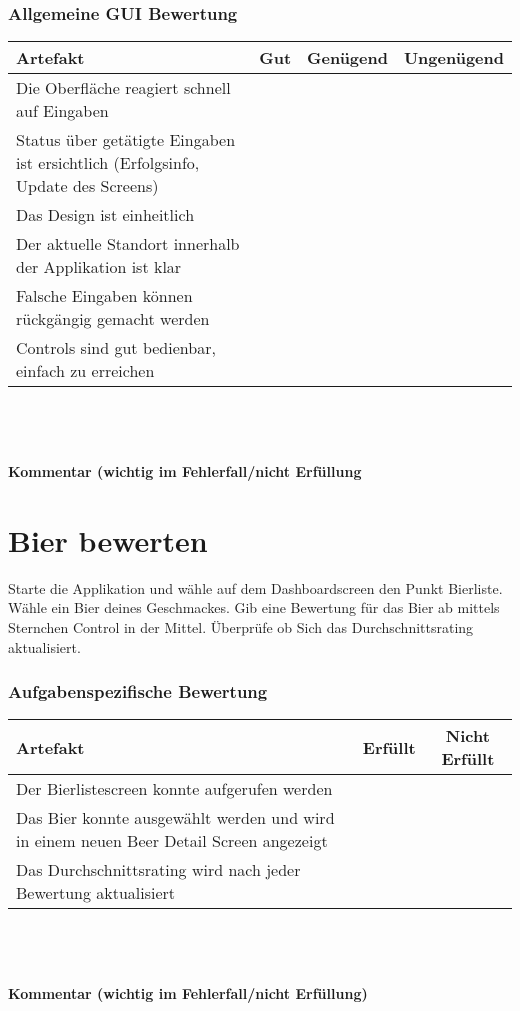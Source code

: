 \documentclass[10pt,a4paper]{scrartcl}
\begin{document}
\subsubsection*{Allgemeine GUI Bewertung}
\begin{tabular}{|l|c|c|c|}
\hline 
\rule[-1ex]{0pt}{2.5ex} \textbf{Artefakt} & \textbf{Gut} & \textbf{Genügend} & \textbf{Ungenügend} \\ 
\hline 
\rule[-1ex]{0pt}{2.5ex} Die Oberfläche reagiert schnell auf Eingaben &  &  &  \\ 
\hline 
\rule[-1ex]{0pt}{2.5ex} Status über getätigte Eingaben ist ersichtlich (Erfolgsinfo, Update des Screens) &  &  &  \\ 
\hline 
\rule[-1ex]{0pt}{2.5ex} Das Design ist einheitlich &  &  &  \\ 
\hline 
\rule[-1ex]{0pt}{2.5ex} Der aktuelle Standort innerhalb der Applikation ist klar &  &  &  \\ 
\hline 
\rule[-1ex]{0pt}{2.5ex} Falsche Eingaben können rückgängig gemacht werden &  &  &  \\ 
\hline 
\rule[-1ex]{0pt}{2.5ex} Controls sind gut bedienbar, einfach zu erreichen &  &  &  \\  
\hline 
\end{tabular} 
\\
\\
\\
\textbf{Kommentar (wichtig im Fehlerfall/nicht Erfüllung}
\vspace*{8cm}

\section{Bier bewerten}
Starte die Applikation und wähle auf dem Dashboardscreen den Punkt Bierliste. Wähle ein Bier deines Geschmackes. Gib eine Bewertung für das Bier ab mittels Sternchen Control in der Mittel. Überprüfe ob Sich das Durchschnittsrating aktualisiert.

\subsubsection*{Aufgabenspezifische Bewertung}
\begin{tabular}{|l|c|c|}
\hline 
\textbf{Artefakt} & \textbf{Erfüllt} & \textbf{Nicht Erfüllt} \\ 
\hline 
Der Bierlistescreen konnte aufgerufen werden &  &  \\ 
\hline 
Das Bier konnte ausgewählt werden und wird in einem neuen Beer Detail Screen angezeigt &  &  \\ 
\hline 
Das Durchschnittsrating wird nach jeder Bewertung aktualisiert &  &  \\ 
\hline 
\end{tabular}
\\
\\
\\
\textbf{Kommentar (wichtig im Fehlerfall/nicht Erfüllung)}
\vspace*{8cm}
\end{document}
